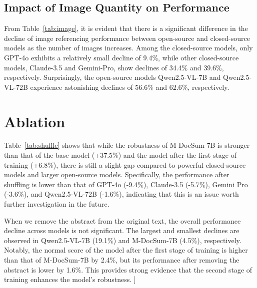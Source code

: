 \subsection{Impact of Image Quantity on Performance}
\label{Impact of Image Quantity on Performance}
From Table~\ref{tab:image}, it is evident that there is a significant difference in the decline of image referencing performance between open-source and closed-source models as the number of images increases. Among the closed-source models, only GPT-4o exhibits a relatively small decline of 9.4\%, while other closed-source models, Claude-3.5 and Gemini-Pro, show declines of 34.4\% and 39.6\%, respectively. Surprisingly, the open-source models Qwen2.5-VL-7B and Qwen2.5-VL-72B experience astonishing declines of 56.6\% and 62.6\%, respectively.

\section{Ablation}
\label{Ablation}
Table~\ref{tab:shuffle} shows that while the robustness of M-DocSum-7B is stronger than that of the base model (+37.5\%) and the model after the first stage of training (+6.8\%), there is still a slight gap compared to powerful closed-source models and larger open-source models. Specifically, the performance after shuffling is lower than that of GPT-4o (-9.4\%), Claude-3.5 (-5.7\%), Gemini Pro (-3.6\%), and Qwen2.5-VL-72B (-1.6\%), indicating that this is an issue worth further investigation in the future.

When we remove the abstract from the original text, the overall performance decline across models is not significant. The largest and smallest declines are observed in Qwen2.5-VL-7B (19.1\%) and M-DocSum-7B (4.5\%), respectively. Notably, the normal score of the model after the first stage of training is higher than that of M-DocSum-7B by 2.4\%, but its performance after removing the abstract is lower by 1.6\%. This provides strong evidence that the second stage of training enhances the model's robustness.
]








